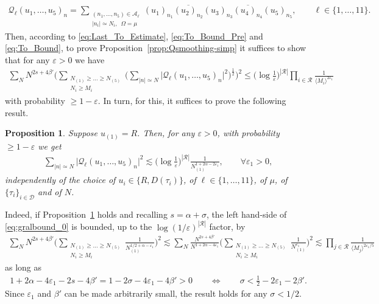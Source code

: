 \documentclass[11pt, xcolor = dvipsnames,reqno
]{amsart}
\newtheorem{prop}[thm]{Proposition}
\theoremstyle{definition}
\theoremstyle{remark}
\begin{document}
\begin{align}\label{eq:Def_Q_ell_Abuse}
    \mathcal{Q}_\ell(u_1, \ldots, u_5)_n = 
    \sum_{\substack{ 
    (n_1, \ldots, n_5) \in \mathcal{A}_\ell  \\
    |n_i| \simeq N_i, \, \, \,  \Omega = \mu } } (u_1)_{n_1} \overline{(u_2)_{n_2}} (u_3)_{n_3} \overline{(u_4)_{n_4}} (u_5)_{n_5}, \qquad \ell \in \{1,\ldots,11\}.
\end{align}
Then, according to \eqref{eq:Last_To_Estimate}, \eqref{eq:To_Bound_Pre} and \eqref{eq:To_Bound}, to prove Proposition~\ref{prop:Qsmoothing-simp} it suffices to show that for any $\varepsilon > 0$ we have
\begin{align}\label{eq:gralbound_0}
    \sum_N N^{2s + 4\beta'} 
    \bigg( \sum_{\substack{N_{(1)} \geq \ldots \geq N_{(5)} \\ N_i \geq M_i }}\Big( \sum_{|n| \simeq N}  \big| \mathcal{Q}_\ell(u_1, \ldots, u_5)_n \big|^2 \Big)^{\frac12}  \bigg)^2 
    \leq  \Big(\log \frac{1}{\varepsilon} \Big)^{|\mathcal{R}|} \prod_{i \in \mathcal{R}}  \frac{1}{\langle M_i \rangle^{2\varepsilon_1}}
\end{align}
with probability $\geq 1-\varepsilon$. 
In turn, for this, it suffices to prove the following result.
\begin{prop}\label{prop:Final_Estimate}
Suppose $u_{(1)} = R$. Then, for any $\varepsilon > 0$, with probability $\geq 1 - \varepsilon$ we get
    \begin{align}\label{eq:gralbound}
    \sum_{|n| \simeq N}  \big| \mathcal{Q}_\ell(u_1, \ldots, u_5)_n \big|^2 
    \lesssim  
     \Big(\log \frac{1}{\varepsilon} \Big)^{|\mathcal{R}|} \frac{1}{N_{(1)}^{1 + 2\alpha - 2\varepsilon_1}},
     \qquad \forall \varepsilon_1 > 0, 
\end{align}
independently of the choice of $u_i \in \{ R, D(\tau_i) \}$, of $\ell \in \{1,\ldots,11\}$,  of $\mu$,  of $\{\tau_i\}_{i \in \mathcal{D}}$ and of $N$. 
\end{prop}

Indeed, if Proposition~\ref{prop:Final_Estimate} holds and recalling $s = \alpha + \sigma$, the left hand-side of \eqref{eq:gralbound_0} is bounded, up to the $\log(1/\varepsilon)^{|\mathcal R|}$ factor, by
\begin{align}
    \sum_N N^{2s + 4\beta'} 
    \bigg( \sum_{\substack{N_{(1)} \geq \ldots \geq N_{(5)} \\ N_i \geq M_i }} \frac{1}{N_{(1)}^{1/2 + \alpha - \varepsilon_1}}  \bigg)^2
    \lesssim 
    \sum_N \frac{N^{2s + 4\beta'}}{N^{1 + 2\alpha - 4\varepsilon_1}}
    \bigg( \sum_{\substack{N_{(1)} \geq \ldots \geq N_{(5)} \\ N_i \geq M_i }} \frac{1}{N_{(1)}^{\varepsilon_1}}  \bigg)^2
    \lesssim \prod_{j \in \mathcal R} \frac{1}{\langle M_j \rangle^{2\varepsilon_1/5}}
\end{align}
as long as
\begin{align}
    1 + 2\alpha - 4\varepsilon_1 - 2s - 4\beta' 
    = 1 - 2\sigma - 4\varepsilon_1 - 4\beta'
    > 0 
    \qquad \Longleftrightarrow \qquad 
    \sigma < \frac12 - 2 \varepsilon_1 - 2\beta'. 
\end{align}
Since $\varepsilon_1$ and $\beta'$ can be made arbitrarily small, the result holds for any $\sigma < 1/2$. 
\end{document}
